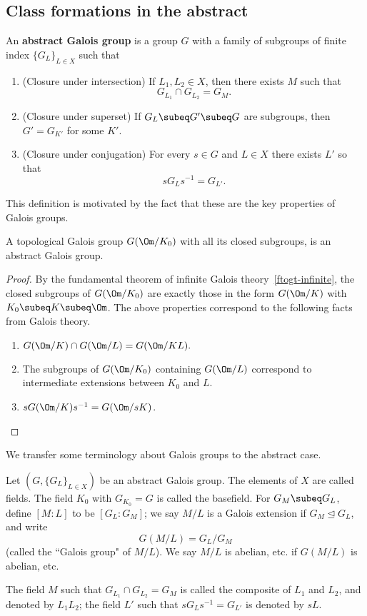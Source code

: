 \subsection{Class formations in the abstract}
\begin{df}
An \textbf{abstract Galois group} is a group $G$ with a family of subgroups of finite index $\{G_L\}_{L\in X}$ such that
\begin{enumerate}
\item (Closure under intersection) If $L_1,L_2\in X$, then there exists $M$ such that
\[
G_{L_1}\cap G_{L_2}=G_M.
\]
\item (Closure under superset) If $G_L\subeq G'\subeq G$ are subgroups, then $G'=G_{K'}$ for some $K'$.
\item (Closure under conjugation) For every $s\in G$ and $L\in X$ there exists $L'$ so that 
\[sG_Ls^{-1}=G_{L'}.\]
\end{enumerate}
\end{df}
This definition is motivated by the fact that these are the key properties of Galois groups.
\begin{pr}
A topological Galois group $G(\Om/K_0)$ with all its closed subgroups, is an abstract Galois group.
\end{pr}
\begin{proof}
By the fundamental theorem of infinite Galois theory~\ref{ftogt-infinite}, the closed subgroups of $G(\Om/K_0)$ are exactly those in the form $G(\Om/K)$ with $K_0\subeq K\subeq \Om$. The above properties correspond to the following facts from Galois theory.
\begin{enumerate}
\item
$
G(\Om/K)\cap G(\Om/L)=G(\Om/KL).
$
\item The subgroups of $G(\Om/K_0)$ containing $G(\Om/L)$ correspond to intermediate extensions between $K_0$ and $L$.
\item $sG(\Om/K)s^{-1}=G(\Om/sK)$.
\qedhere
\end{enumerate}
\end{proof}
We transfer some terminology about Galois groups to the abstract case.
\begin{df}
Let $(G,\{G_L\}_{L\in X})$ be an abstract Galois group. The elements of $X$ are called fields. The field $K_0$ with $G_{K_0}=G$ is called the basefield. 
For $G_M\subeq G_L$, define $[M:L]$ to be $[G_L:G_M]$; 
we say $M/L$ is a Galois extension if $G_M\trianglelefteq G_L$, and write
\[
G(M/L)=G_L/G_M
\]
(called the ``Galois group" of $M/L$). We say $M/L$ is abelian, etc. if $G(M/L)$ is abelian, etc.

The field $M$ such that $G_{L_1}\cap G_{L_2}=G_{M}$ is called the composite of $L_1$ and $L_2$, and denoted by $L_1L_2$; the field $L'$ such that $sG_Ls^{-1}=G_{L'}$ is denoted by $sL$.
\end{df}
